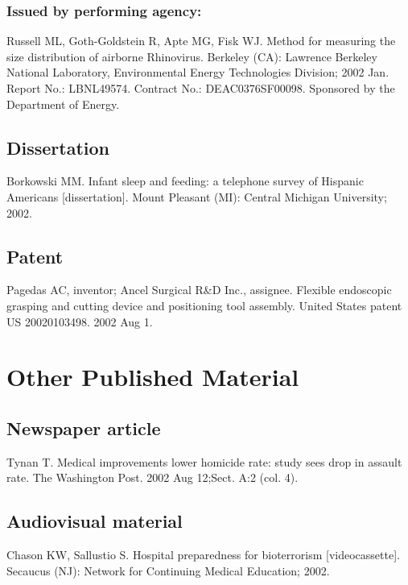 \documentclass[a4paper,10pt]{article}
\begin{document}
\subsubsection{Issued by performing agency:}

Russell ML, Goth-Goldstein R, Apte MG, Fisk WJ. Method for measuring the size distribution of airborne Rhinovirus. Berkeley (CA): Lawrence Berkeley National Laboratory, Environmental Energy Technologies Division; 2002 Jan. Report No.: LBNL49574. Contract No.: DEAC0376SF00098. Sponsored by the Department of Energy.\cite{russell.goth-goldstein.ea:method}

\subsection{Dissertation}

Borkowski MM. Infant sleep and feeding: a telephone survey of Hispanic Americans [dissertation]. Mount Pleasant (MI): Central Michigan University; 2002.\cite{borkowski:infant}

\subsection{Patent}

Pagedas AC, inventor; Ancel Surgical R\&D Inc., assignee. Flexible endoscopic grasping and cutting device and positioning tool assembly. United States patent US 20020103498. 2002 Aug 1.\cite{pagedas:flexible}

\section{Other Published Material}

\subsection{Newspaper article}

Tynan T. Medical improvements lower homicide rate: study sees drop in assault rate. The Washington Post. 2002 Aug 12;Sect. A:2 (col. 4).\cite{tynan:medical}

\subsection{Audiovisual material}

Chason KW, Sallustio S. Hospital preparedness for bioterrorism [videocassette]. Secaucus (NJ): Network for Continuing Medical Education; 2002.\cite{chason.sallustio:hospital}
\end{document}
